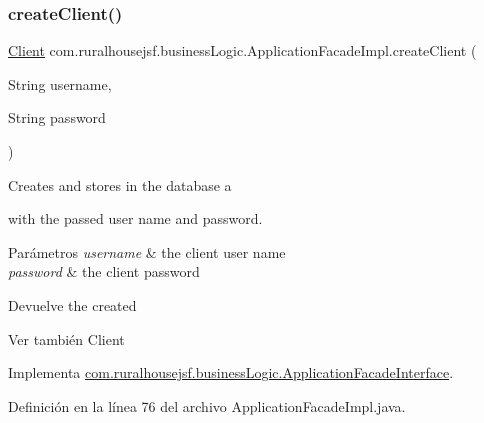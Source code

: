 \subsubsection{\texorpdfstring{createClient()}{createClient()}}
{\footnotesize\ttfamily \mbox{\hyperlink{classcom_1_1ruralhousejsf_1_1domain_1_1_client}{Client}} com.\+ruralhousejsf.\+business\+Logic.\+Application\+Facade\+Impl.\+create\+Client (\begin{DoxyParamCaption}\item[{String}]{username,  }\item[{String}]{password }\end{DoxyParamCaption})}

Creates and stores in the database a
\begin{DoxyCode}{0}
\end{DoxyCode}
 with the passed user name and password.


\begin{DoxyParams}{Parámetros}
{\em username} & the client user name \\
\hline
{\em password} & the client password\\
\hline
\end{DoxyParams}
\begin{DoxyReturn}{Devuelve}
the created
\begin{DoxyCode}{0}
\end{DoxyCode}

\end{DoxyReturn}
\begin{DoxySeeAlso}{Ver también}
Client 
\end{DoxySeeAlso}


Implementa \mbox{\hyperlink{interfacecom_1_1ruralhousejsf_1_1business_logic_1_1_application_facade_interface_acb939a4c57b1136e2e8d1c7b661c10af}{com.\+ruralhousejsf.\+business\+Logic.\+Application\+Facade\+Interface}}.



Definición en la línea 76 del archivo Application\+Facade\+Impl.\+java.

\mbox{\label{classcom_1_1ruralhousejsf_1_1business_logic_1_1_application_facade_impl_acbf81cc6dc4bf9adf9ea7a85751edfc0}} 
